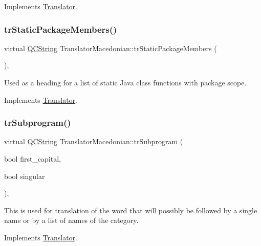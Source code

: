 Implements \mbox{\hyperlink{class_translator}{Translator}}.

\mbox{\label{class_translator_macedonian_a1831b8346a4f3eb2634c112def381d1b}} 
\subsubsection{\texorpdfstring{trStaticPackageMembers()}{trStaticPackageMembers()}}
{\footnotesize\ttfamily virtual \mbox{\hyperlink{class_q_c_string}{Q\+C\+String}} Translator\+Macedonian\+::tr\+Static\+Package\+Members (\begin{DoxyParamCaption}{ }\end{DoxyParamCaption})\hspace{0.3cm}{\ttfamily [inline]}, {\ttfamily [virtual]}}

Used as a heading for a list of static Java class functions with package scope. 

Implements \mbox{\hyperlink{class_translator}{Translator}}.

\mbox{\label{class_translator_macedonian_a50fa65b1f21b134f9075f324d87df626}} 
\subsubsection{\texorpdfstring{trSubprogram()}{trSubprogram()}}
{\footnotesize\ttfamily virtual \mbox{\hyperlink{class_q_c_string}{Q\+C\+String}} Translator\+Macedonian\+::tr\+Subprogram (\begin{DoxyParamCaption}\item[{bool}]{first\+\_\+capital,  }\item[{bool}]{singular }\end{DoxyParamCaption})\hspace{0.3cm}{\ttfamily [inline]}, {\ttfamily [virtual]}}

This is used for translation of the word that will possibly be followed by a single name or by a list of names of the category. 

Implements \mbox{\hyperlink{class_translator}{Translator}}.

